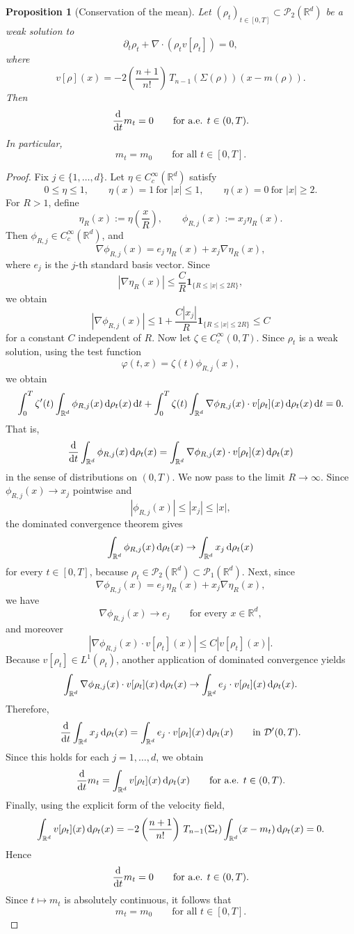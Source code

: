 \documentclass[11pt,reqno]{amsart}
\numberwithin{figure}{section}
\def\d {{\partial}}
\def\d{\mathrm{d}}
\renewcommand{\d}{  {\textup{d}} }
\newtheorem{proposition}{Proposition}[section]
\begin{document}
\begin{proposition}[Conservation of the mean] \label{prop:mean-conservation} Let $(\rho_t)_{t\in[0,T]}\subset \mathcal P_2(\mathbb R^d)$ be a weak solution to \[ \partial_t\rho_t+\nabla\cdot(\rho_t v[\rho_t])=0, \] where \[ v[\rho](x) = -2\left(\frac{n+1}{n!}\right)\,T_{n-1}(\Sigma(\rho))(x-m(\rho)). \] Then \[ \frac{\d}{\d t}m_t=0 \qquad\text{for a.e. }t\in(0,T). \] In particular, \[ m_t=m_0 \qquad\text{for all }t\in[0,T]. \] \end{proposition} \begin{proof} Fix $j\in\{1,\dots,d\}$. Let $\eta\in C_c^\infty(\mathbb R^d)$ satisfy \[ 0\le \eta\le 1, \qquad \eta(x)=1 \ \text{for } |x|\le 1, \qquad \eta(x)=0 \ \text{for } |x|\ge 2. \] For $R>1$, define \[ \eta_R(x):=\eta\!\left(\frac{x}{R}\right), \qquad \phi_{R,j}(x):=x_j\eta_R(x). \] Then $\phi_{R,j}\in C_c^\infty(\mathbb R^d)$, and \[ \nabla\phi_{R,j}(x) = e_j\,\eta_R(x)+x_j\nabla\eta_R(x), \] where $e_j$ is the $j$-th standard basis vector. Since \[ |\nabla\eta_R(x)|\le \frac{C}{R}\mathbf 1_{\{R\le |x|\le 2R\}}, \] we obtain \[ |\nabla\phi_{R,j}(x)| \le 1 + \frac{C|x_j|}{R}\mathbf 1_{\{R\le |x|\le 2R\}} \le C \] for a constant $C$ independent of $R$. Now let $\zeta\in C_c^\infty(0,T)$. Since $\rho_t$ is a weak solution, using the test function \[ \varphi(t,x)=\zeta(t)\phi_{R,j}(x), \] we obtain \[ \int_0^T \zeta'(t)\int_{\mathbb R^d}\phi_{R,j}(x)\,\d\rho_t(x)\,\d t + \int_0^T \zeta(t)\int_{\mathbb R^d}\nabla\phi_{R,j}(x)\cdot v[\rho_t](x)\,\d\rho_t(x)\,\d t =0. \] That is, \[ \frac{\d}{\d t}\int_{\mathbb R^d}\phi_{R,j}(x)\,\d\rho_t(x) = \int_{\mathbb R^d}\nabla\phi_{R,j}(x)\cdot v[\rho_t](x)\,\d\rho_t(x) \] in the sense of distributions on $(0,T)$. We now pass to the limit $R\to\infty$. Since $\phi_{R,j}(x)\to x_j$ pointwise and \[ |\phi_{R,j}(x)|\le |x_j|\le |x|, \] the dominated convergence theorem gives \[ \int_{\mathbb R^d}\phi_{R,j}(x)\,\d\rho_t(x)\to \int_{\mathbb R^d}x_j\,\d\rho_t(x) \] for every $t\in[0,T]$, because $\rho_t\in \mathcal P_2(\mathbb R^d)\subset \mathcal P_1(\mathbb R^d)$. Next, since \[ \nabla\phi_{R,j}(x) = e_j\,\eta_R(x)+x_j\nabla\eta_R(x), \] we have \[ \nabla\phi_{R,j}(x)\to e_j \qquad\text{for every }x\in\mathbb R^d, \] and moreover \[ |\nabla\phi_{R,j}(x)\cdot v[\rho_t](x)| \le C|v[\rho_t](x)|. \] Because $v[\rho_t]\in L^1(\rho_t)$, another application of dominated convergence yields \[ \int_{\mathbb R^d}\nabla\phi_{R,j}(x)\cdot v[\rho_t](x)\,\d\rho_t(x) \to \int_{\mathbb R^d} e_j\cdot v[\rho_t](x)\,\d\rho_t(x). \] Therefore, \[ \frac{\d}{\d t}\int_{\mathbb R^d}x_j\,\d\rho_t(x) = \int_{\mathbb R^d} e_j\cdot v[\rho_t](x)\,\d\rho_t(x) \qquad\text{in }\mathcal D'(0,T). \] Since this holds for each $j=1,\dots,d$, we obtain \[ \frac{\d}{\d t}m_t = \int_{\mathbb R^d}v[\rho_t](x)\,\d\rho_t(x) \qquad\text{for a.e. }t\in(0,T). \] Finally, using the explicit form of the velocity field, \[ \int_{\mathbb R^d}v[\rho_t](x)\,\d\rho_t(x) = -2\left(\frac{n+1}{n!}\right)\,T_{n-1}(\Sigma_t) \int_{\mathbb R^d}(x-m_t)\,\d\rho_t(x) = 0. \] Hence \[ \frac{\d}{\d t}m_t=0 \qquad\text{for a.e. }t\in(0,T). \] Since $t\mapsto m_t$ is absolutely continuous, it follows that \[ m_t=m_0 \qquad\text{for all }t\in[0,T]. \] \end{proof}
\end{document}
